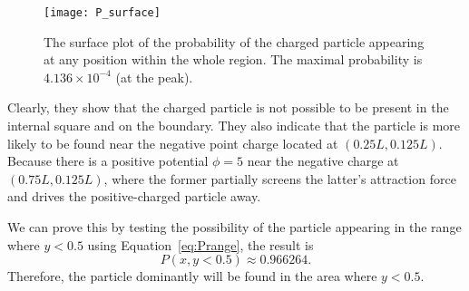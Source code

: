 \begin{figure}[!hbt]
    \centering
    \texttt{[image: P\_surface]}
    \caption{The surface plot of the probability of the charged particle appearing at any
        position within the whole region. The maximal probability is $4.136 \times 10^{-4}$
        (at the peak).}
    \label{fig:P_surface}
\end{figure}

Clearly, they show that the charged particle is not possible to be present in the
internal square and on the boundary.
They also indicate that the particle is more likely to be found near the negative
point charge located at \((0.25L, 0.125L)\). Because there is a positive potential
$\phi = 5$ near the negative charge at \((0.75L, 0.125L)\), where the former partially
screens the latter's attraction force and drives the positive-charged particle away.

We can prove this by testing the possibility of the particle appearing in the
range where $y < 0.5$ using Equation~\eqref{eq:Prange}, the result is
%
\begin{equation}
    P(x, y < 0.5) \approx 0.966264.
\end{equation}
%
Therefore, the particle dominantly will be found in the area where $y < 0.5$.
